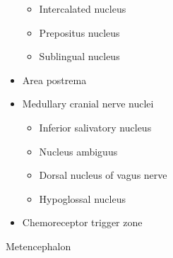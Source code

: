 \begin{itemize}
  \begin{itemize}
  \tightlist
  \item
    Intercalated nucleus
  \item
    Prepositus nucleus
  \item
    Sublingual nucleus
  \end{itemize}
\item
  Area postrema
\item
  Medullary cranial nerve nuclei

  \begin{itemize}
  \tightlist
  \item
    Inferior salivatory nucleus
  \item
    Nucleus ambiguus
  \item
    Dorsal nucleus of vagus nerve
  \item
    Hypoglossal nucleus
  \end{itemize}
\item
  Chemoreceptor trigger zone
\end{itemize}

Metencephalon

